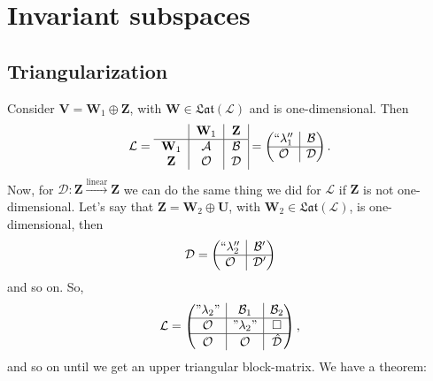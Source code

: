 \documentclass{article}
\theoremstyle{definition}
\newcommand{\V}{\mathbf{V}}
\newcommand{\W}{\mathbf{W}}
\newcommand{\Z}{\mathbf{Z}}
\newcommand{\U}{\mathbf{U}}
\newcommand{\lag}{\mathcal{L}}
\newcommand{\lin}{\overset{\text{linear}}{\longrightarrow}}
\newcommand{\rvline}{\hspace*{-\arraycolsep}\vline\hspace*{-\arraycolsep}}
\begin{document}
\newpage
\section{Invariant subspaces}

\subsection{Triangularization}

Consider $\V = \W_1 \oplus \Z$, with $\W \in \mathfrak{Lat}(\lag)$ and is one-dimensional. Then
\begin{align*}
\lag = \begin{tabular}{c|c|c|}
& $\W_1$ & $\Z$\\
\hline
$\W_1$& $\mathcal{A}$ & $\mathcal{B}$ \\	
$\Z$& $\mathcal{O}$  & $\mathcal{D}$ 
\end{tabular}=
\begin{pmatrix}
``\lambda_1'' & \rvline & \mathcal{B}\\
\hline
\mathcal{O} & \rvline & \mathcal{D}
\end{pmatrix}.
\end{align*}
Now, for $\mathcal{D} : \Z \lin \Z$ we can do the same thing we did for $\lag$ if $\Z$ is not one-dimensional. Let's say that $\Z = \W_2 \oplus \U$, with $\W_2 \in \mathfrak{Lat}(\lag)$, is one-dimensional, then
\begin{align*}
\mathcal{D} = \begin{pmatrix}
``\lambda_2'' & \rvline & \mathcal{B'}\\
\hline
\mathcal{O} & \rvline & \mathcal{D'}
\end{pmatrix}
\end{align*}
and so on. So, 
\begin{align*}
\lag = \begin{pmatrix}
"\lambda_2" & \rvline & \mathcal{B}_1 & \rvline & \mathcal{B}_2\\
\hline
\mathcal{O} & \rvline & "\lambda_2" & \rvline &\square\\
\hline
\mathcal{O} & \rvline & \mathcal{O}& \rvline &\hat{\mathcal{D}}\\
\end{pmatrix},
\end{align*}
and so on until we get an upper triangular block-matrix. We have a theorem:
\end{document}
